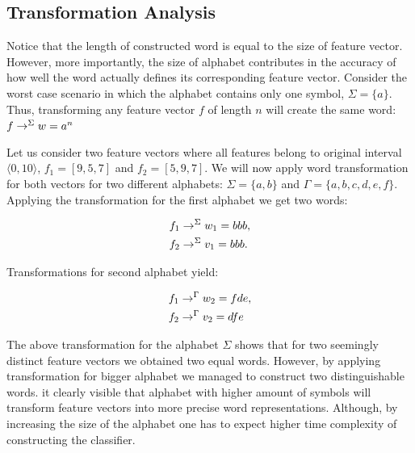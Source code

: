 \documentclass{mini}
\begin{document}
\subsection{Transformation Analysis}\label{sec:lan_theory_transf_prec}

Notice that the length of constructed word is equal to the size of feature vector. However, more importantly, the size of alphabet contributes in the accuracy of how well the word actually defines its corresponding feature vector. Consider the worst case scenario in which the alphabet contains only one symbol, $\Sigma=\{a\}$. Thus, transforming any feature vector $f$ of length $n$ will create the same word: $f \rightarrow^{\Sigma} w = a^{n}$


\begin{example} \label{ex:transf_prec}
    Let us consider two feature vectors where all features belong to original interval $\langle 0, 10 \rangle$, $f_1=[9, 5, 7]$ and $f_2=[5,9,7]$. We will now apply word transformation for both vectors for two different alphabets: $\Sigma=\{a,b\}$ and $\Gamma=\{a,b,c,d,e,f\}$. Applying the transformation for the first alphabet we get two words: 
    
    \begin{center}
        \begin{align*}
        &f_1 \rightarrow^{\Sigma} w_1 = bbb, \\ &f_2 \rightarrow^{\Sigma} v_1 = bbb.
        \end{align*}
    \end{center}
    
    Transformations for second alphabet yield: 
    
    \begin{center}
        \begin{align*}
        &f_1 \rightarrow^{\Gamma} w_2 = fde, \\ &f_2 \rightarrow^{\Gamma} v_2 = dfe
        \end{align*}
    \end{center}
\end{example}

The above transformation for the alphabet $\Sigma$ shows that for two seemingly distinct feature vectors we obtained two equal words. However, by applying transformation for bigger alphabet we managed to construct two distinguishable words.
it clearly visible that alphabet with higher amount of symbols will transform feature vectors into more precise word representations. Although, by increasing the size of the alphabet one has to expect higher time complexity of constructing the classifier.
\end{document}
